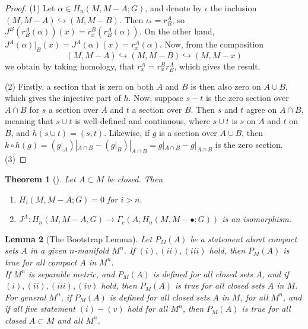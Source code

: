 \documentclass[reqno]{amsart}
\newtheorem{theorem}{Theorem}[section]
\newtheorem{lemma}[theorem]{Lemma}
\theoremstyle{definition}
\theoremstyle{remark}
\begin{document}
\begin{proof}
    (1) Let $\alpha \in 
    H_n(M, M - A;G)$, and denote by
    $\iota$ the inclusion $(M, M-A) \hookrightarrow (M, M-B)$.
    Then $\iota_* = r_{B}^{A}$, so
    $J^{B} \left( r_{B}^{A} (\alpha) \right) (x)
    = r_{x}^{B}\left( r_{B}^{A} (\alpha) \right) $.
    On the other hand, 
    $J^{A}(\alpha)|_{B}(x) =
    J^{A}(\alpha)(x) = 
    r_x^{A}(\alpha)$.
    Now, from the composition
    \[
        (M, M - A) \hookrightarrow 
        (M, M - B) \hookrightarrow 
        (M, M - x)
    \] 
    we obtain by taking homology, that
    $r_x^{A} = r_x^{B} r_{B}^{A}$, which gives the
    result.\\
    \linebreak
    
    (2) Firstly, a section that is zero on both
    $A$ and $B$ is then also zero on
    $A \cup  B$, which gives the injective part
    of $h$. Now, 
    suppose $s-t$ is the zero section over $A \cap B$ 
    for $s$ a section over $A$ and $t$ a section over $B$.
    Then $s$ and $t$ agree on $A \cap B$, meaning that
    $s \cup t$ is well-defined and continuous, where
    $s \cup t$ is $s$ on $A$ and $t$ on $B$, and
    $h(s \cup t) = (s,t)$. Likewise, if
    $g$ is a section over $A \cup  B$, then
    $k \circ h(g) = \left( g|_{A} \right)|_{A \cap B}
    - \left( g|_{B} \right)|_{A \cap B}
    = g|_{A \cap B} - g|_{A \cap B}$ is the
    zero section.\\
    \linebreak
    (3) 

\end{proof}


\begin{theorem}[]\label{Thm:OGPAL}
    Let $A \subset M$ be closed. Then
    \begin{enumerate}
        \item $H_i \left( M , M - A; G \right) = 0$ for $i>n$.
        \item $J^{A} \colon H_n (M, M - A, G) \to 
            \Gamma_c (A, 
            H_n\left( M, M - \bullet;G \right) )$ is an isomorphism.
    \end{enumerate}
\end{theorem}



\begin{lemma}[The Bootstrap Lemma]
    Let $P_M (A)$ be a statement about compact sets
    $A$ in a given $n$-manifold $M^{n}$. If
    $(i), (ii), (iii)$ hold, then $P_M(A)$ is true
    for all compact $A$ in $M^{n}$.\\
    If $M^{n}$ is separable metric, and $P_M(A)$ is defined
    for all closed sets $A$, and if 
    $(i), (ii), (iii), (iv)$ hold, then $P_M(A)$ is true
    for all closed sets $A$ in $M$.\\
    For general $M^{n}$, if $P_M(A)$ is defined for all closed
    sets $A$ in $M$, for all $M^{n}$, and if all
    five statement $(i) - (v)$ hold for all $M^{n}$, then
    $P_M(A)$ is true for all closed $A \subset M$ and
    all $M^{n}$.
\end{lemma}
\end{document}
